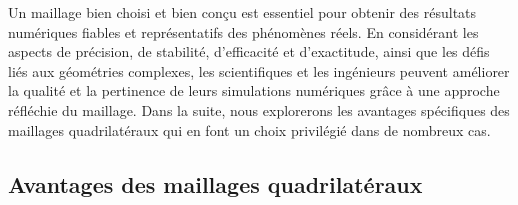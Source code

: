 Un maillage bien choisi et bien conçu est essentiel pour obtenir des résultats numériques fiables et représentatifs des phénomènes réels. En considérant les aspects de précision, de stabilité, d'efficacité et d'exactitude, ainsi que les défis liés aux géométries complexes, les scientifiques et les ingénieurs peuvent améliorer la qualité et la pertinence de leurs simulations numériques grâce à une approche réfléchie du maillage. Dans la suite, nous explorerons les avantages spécifiques des maillages quadrilatéraux qui en font un choix privilégié dans de nombreux cas.

\subsection{Avantages des maillages quadrilatéraux}

